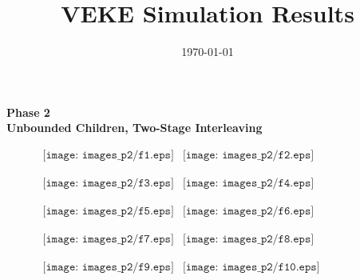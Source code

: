 \documentclass[a4paper,10pt]{article}
\title{VEKE Simulation Results}
\author{}
\date{\today}
\begin{document}
\maketitle

\begin{center}
\huge{\textbf{Phase 2}}  \\
\LARGE{\textbf{Unbounded Children, Two-Stage Interleaving}}
\end{center}

\begin{figure}[h]
\begin{center}$
\begin{array}{cc}
\texttt{[image: images\_p2/f1.eps]} &
\texttt{[image: images\_p2/f2.eps]}
\end{array}$
\end{center}
\end{figure}

\begin{figure}[h]
\begin{center}$
\begin{array}{cc}
\texttt{[image: images\_p2/f3.eps]} &
\texttt{[image: images\_p2/f4.eps]}
\end{array}$
\end{center}
\end{figure}

\begin{figure}[h]
\begin{center}$
\begin{array}{cc}
\texttt{[image: images\_p2/f5.eps]} &
\texttt{[image: images\_p2/f6.eps]}
\end{array}$
\end{center}
\end{figure}

\begin{figure}[h]
\begin{center}$
\begin{array}{cc}
\texttt{[image: images\_p2/f7.eps]} &
\texttt{[image: images\_p2/f8.eps]}
\end{array}$
\end{center}
\end{figure}

\begin{figure}[h]
\begin{center}$
\begin{array}{cc}
\texttt{[image: images\_p2/f9.eps]} &
\texttt{[image: images\_p2/f10.eps]}
\end{array}$
\end{center}
\end{figure}
\end{document}
